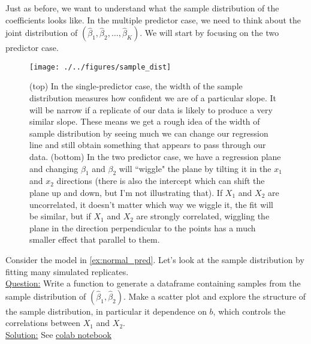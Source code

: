 Just as before, we want to understand what the sample distribution of the coefficients looks like. In the multiple predictor case, we need to think about the joint distribution  of $(\hat{\beta}_1,\hat{\beta}_2,\dots,\hat{\beta}_K)$. We will start by focusing on the two predictor case.  



\begin{figure}[h]
    \centering
    \texttt{[image: ./../figures/sample\_dist]}
    \caption{(top) In the single-predictor case, the width of the sample distribution measures how confident we are of a particular slope. It will be narrow if a replicate of our data is likely to produce a very similar slope.  These means we get a rough idea of the width of sample distribution by seeing much we can change our regression line and still obtain something that appears to pass through our data. (bottom) In the two predictor case, we have a regression plane and changing $\beta_1$ and $\beta_2$ will ``wiggle" the plane by tilting it in the $x_1$ and $x_2$ directions (there is also the intercept which can shift the plane up and down, but I'm not illustrating that). If $X_1$ and $X_2$ are uncorrelated, it doesn't matter which way we wiggle it, the fit will be similar, but if $X_1$ and $X_2$ are strongly correlated, wiggling the plane in the direction perpendicular  to the points has a much smaller effect that parallel to them. }
    \label{fig:sample_dist}
\end{figure}



\begin{example}

Consider the model in \ref{ex:normal_pred}. Let's look at the sample distribution by fitting many simulated replicates. \\

\noindent
\underline{Question:} Write a function to generate a dataframe containing samples from the sample distribution of $(\hat{\beta}_1,\hat{\beta}_2)$. Make a scatter plot and explore the structure of the sample distribution, in particular it dependence on $b$, which controls the correlations between $X_1$ and $X_2$. \\


\noindent
\underline{Solution:} 
See \href{https://colab.research.google.com/drive/1oIRgP_7-c5DGV1D2iz5nj406mZfJxUIG?usp=sharing}{colab notebook}

\end{example}

